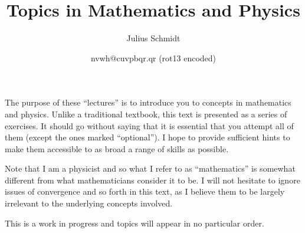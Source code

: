 \title{Topics in Mathematics and Physics}
\author{Julius Schmidt}
\date{nvwh@cuvpbqr.qr (rot13 encoded)}

\maketitle
The purpose of these ``lectures'' is to introduce you to concepts in mathematics and physics.
Unlike a traditional textbook, this text is presented as a series of exercises.
It should go without saying that it is essential that you attempt all of them (except the ones marked ``optional'').
I hope to provide sufficient hints to make them accessible to as broad a range of skills as possible.

Note that I am a physicist and so what I refer to as ``mathematics'' is somewhat different from what mathematicians consider it to be.
I will not hesitate to ignore issues of convergence and so forth in this text, as I believe them to be largely irrelevant to the underlying concepts involved.

This is a work in progress and topics will appear in no particular order.



